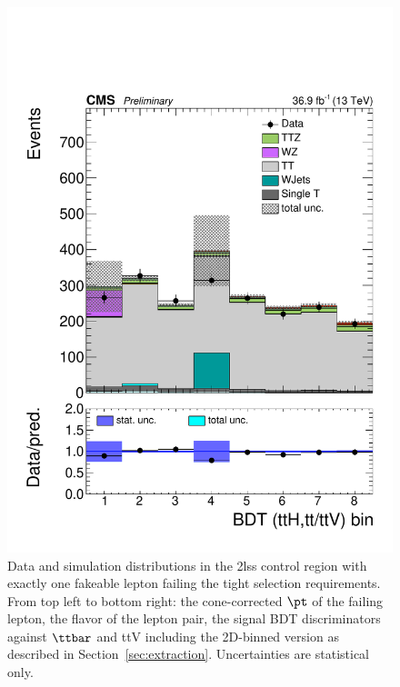 \begin{figure}[!htb]
\includegraphics[width=0.30\linewidth]{plots_controlregions/2lss_appl_1fo_data/kinMVA_2lss_bins8_withBDTv8_withHj_ourBinning.pdf}
\caption{Data and simulation distributions in the 2lss control region with exactly one fakeable lepton failing the tight selection requirements.
From top left to bottom right: the cone-corrected $\pt$ of the failing lepton, the flavor of the lepton pair, the signal BDT discriminators against $\ttbar$ and ttV including the 2D-binned version as described in Section~\ref{sec:extraction}.
Uncertainties are statistical only.
}
\label{fig:cr_2lss_appl_1fo_1}
\end{figure}

